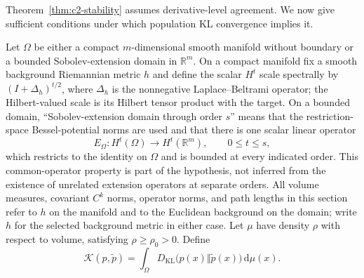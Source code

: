 \documentclass[11pt]{article}
\theoremstyle{definition}
\theoremstyle{remark}
\newcommand{\R}{\mathbb{R}}
\newcommand{\KL}{D_{\mathrm{KL}}}
\newcommand{\dd}{\mathrm{d}}
\begin{document}
Theorem~\ref{thm:c2-stability} assumes derivative-level agreement. We now give sufficient conditions under which population KL convergence implies it.

Let $\Omega$ be either a compact $m$-dimensional smooth manifold without
boundary or a bounded Sobolev-extension domain in $\R^m$. On a compact
manifold fix a smooth background Riemannian metric $h$ and define the scalar
$H^t$ scale spectrally by $(I+\Delta_h)^{t/2}$, where $\Delta_h$ is the
nonnegative Laplace--Beltrami operator; the Hilbert-valued scale is its
Hilbert tensor product with the target. On a bounded domain, ``Sobolev-extension
domain through order $s$'' means that the restriction-space Bessel-potential
norms are used and that there is one scalar linear operator
\begin{equation}
  E_\Omega:H^t(\Omega)\longrightarrow H^t(\R^m),
  \qquad 0\le t\le s,
  \label{eq:total-extension-definition}
\end{equation}
which restricts to the identity on $\Omega$ and is bounded at every indicated
order. This common-operator property is part of the hypothesis, not inferred
from the existence of unrelated extension operators at separate orders. All
volume measures, covariant $C^k$ norms, operator norms, and path lengths in this
section refer to $h$ on the manifold and to the Euclidean background on the
domain; write $h$ for the selected background metric in either case. Let $\mu$
have density $\rho$ with respect to volume, satisfying
$\rho\ge\rho_0>0$. Define
\begin{equation}
    \mathcal K(p,\widetilde p)
    =\int_\Omega \KL\bigl(p(x)\Vert\widetilde p(x)\bigr)\,\dd\mu(x).
\end{equation}
\end{document}
